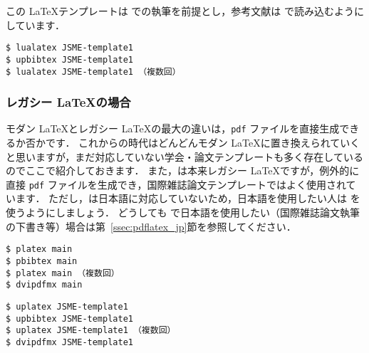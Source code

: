 この \LaTeX テンプレートは \LuaLaTeX での執筆を前提とし，参考文献は \BibTeX で読み込むようにしています．

\begin{tcolorbox}[enhanced, title=\LuaLaTeX$+$\upBibTeX, drop fuzzy shadow]
\begin{verbatim}
$ lualatex JSME-template1
$ upbibtex JSME-template1
$ lualatex JSME-template1 （複数回）
\end{verbatim}
\end{tcolorbox}

\subsubsection*{レガシー \LaTeX の場合}

モダン \LaTeX とレガシー \LaTeX の最大の違いは，\verb|pdf| ファイルを直接生成できるか否かです．
これからの時代はどんどんモダン \LaTeX に置き換えられていくと思いますが，まだ対応していない学会・論文テンプレートも多く存在しているのでここで紹介しておきます．
また，\pdfLaTeX は本来レガシー \LaTeX ですが，例外的に直接 \verb|pdf| ファイルを生成でき，国際雑誌論文テンプレートではよく使用されています．
ただし，\pdfLaTeX は日本語に対応していないため，日本語を使用したい人は \LuaLaTeX を使うようにしましょう．
どうしても \pdfLaTeX で日本語を使用したい（国際雑誌論文執筆の下書き等）場合は第~\ref{ssec:pdflatex_jp}節を参照してください．





\begin{tcolorbox}[enhanced, title=\pLaTeX$+$\pBibTeX, drop fuzzy shadow]
\begin{verbatim}
$ platex main
$ pbibtex main
$ platex main （複数回）
$ dvipdfmx main
\end{verbatim}
\end{tcolorbox}


\begin{tcolorbox}[enhanced, title=\upLaTeX$+$\upBibTeX, drop fuzzy shadow]
\begin{verbatim}
$ uplatex JSME-template1
$ upbibtex JSME-template1
$ uplatex JSME-template1 （複数回）
$ dvipdfmx JSME-template1
\end{verbatim}
\end{tcolorbox}

